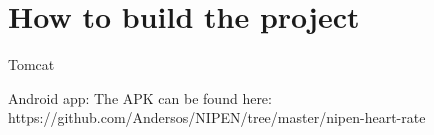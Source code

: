 \chapter{How to build the project}
\label{AppendixB}


Tomcat 

Android app:
The APK can be found here: https://github.com/Andersos/NIPEN/tree/master/nipen-heart-rate